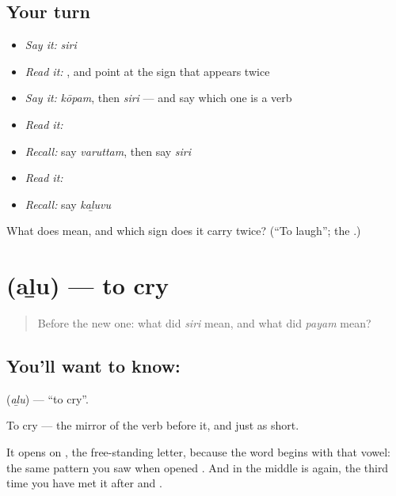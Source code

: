 \subsection*{Your turn}
\begin{itemize}
\raggedright
  \item \emph{Say it:} \emph{siri}
  \item \emph{Read it:} \textbf{}, and point at the sign that appears twice
  \item \emph{Say it:} \emph{kōpam}, then \emph{siri} — and say which one is a verb
  \item \emph{Read it:} \textbf{}
  \item \emph{Recall:} say \emph{varuttam}, then say \emph{siri}
  \item \emph{Read it:} \textbf{}
  \item \emph{Recall:} say \emph{kaḻuvu}
\end{itemize}

\begin{tcolorbox}[breakable,colback=teal!4,colframe=teal!35!black,title={Before you move on}]
What does  mean, and which sign does it carry twice? (\textquotedblleft{}To laugh\textquotedblright{}; the \textbf{}.)
\end{tcolorbox}
\section[\texorpdfstring{\ta{அழு} (aḻu)}{அழு (aḻu)}]{ (aḻu) — to cry}

\label{lesson:TA-C72-cry}



\begin{quote}
Before the new one: what did \emph{siri} mean, and what did \emph{payam} mean?
\end{quote}

\subsection*{You'll want to know: }
\textbf{} (\emph{aḻu}) — \textquotedblleft{}to cry\textquotedblright{}.

To cry — the mirror of the verb before it, and just as short.

It opens on , the free-standing letter, because the word begins with that vowel: the same pattern you saw when  opened . And in the middle is \textbf{} again, the third time you have met it after  and .

